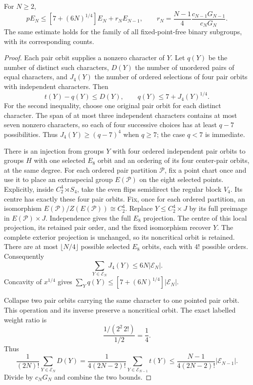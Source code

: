 \begin{proposition}\label{prop:binary-moment}
For $N\geq2$,
\begin{equation}\label{eq:binary-moment}
 pE_N\leq[7+(6N)^{1/4}]E_N+r_NE_{N-1},\qquad
 r_N=\frac{N-1}{4}\frac{c_{N-1}G_{N-1}}{c_NG_N}.
\end{equation}
The same estimate holds for the family of all fixed-point-free binary
subgroups, with its corresponding counts.
\end{proposition}
\begin{proof}
Each pair orbit supplies a nonzero character of $Y$. Let $q(Y)$ be
the number of distinct such characters, $D(Y)$ the number of unordered
pairs of equal characters, and $J_4(Y)$ the number of ordered selections
of four pair orbits with independent characters. Then
\[
 t(Y)-q(Y)\leq D(Y),\qquad
 q(Y)\leq7+J_4(Y)^{1/4}.
\]
For the second inequality, choose one original pair orbit for each
distinct character. The span of at most three independent characters
contains at most seven nonzero characters, so each of four successive
choices has at least $q-7$ possibilities. Thus
$J_4(Y)\geq(q-7)^4$ when $q\geq7$; the case $q<7$ is immediate.

There is an injection from groups $Y$ with four ordered independent
pair orbits to groups $H$ with one selected $E_8$ orbit and an ordering
of its four center-pair orbits, at the same degree. For each ordered
pair partition $\mathcal P$, fix a point chart once and use it to place
an extraspecial group $E(\mathcal P)$ on the eight selected points.
Explicitly, inside $C_2^4\rtimes S_4$, take the even flips semidirect
the regular block $V_4$. Its centre has exactly these four pair orbits.
Fix, once for each ordered partition,
an isomorphism $E(\mathcal P)/Z(E(\mathcal P))\cong C_2^4$.
Replace $Y\leq C_2^4\times J$ by its full preimage in
$E(\mathcal P)\times J$. Independence gives the full $E_8$ projection.
The centre of this local projection, its retained pair order, and the
fixed isomorphism recover $Y$.
The complete exterior projection is unchanged, so its noncritical
orbit is retained. There are at most $\lfloor N/4\rfloor$ possible
selected $E_8$ orbits, each with $4!$ possible orders. Consequently
\[
 \sum_{Y\in\mathcal E_N}J_4(Y)\leq 6N|\mathcal E_N|.
\]
Concavity of $x^{1/4}$ gives
$\sum_Yq(Y)\leq[7+(6N)^{1/4}]|\mathcal E_N|$.

Collapse two pair orbits carrying the same character to one pointed
pair orbit. This operation and its inverse preserve a noncritical
orbit. The exact labelled weight ratio is
\[
 \frac{1/(2^2\,2!)}{1/2}=\frac14.
\]
Thus
\[
 \frac1{(2N)!}\sum_{Y\in\mathcal E_N}D(Y)
 =\frac{1}{4(2N-2)!}\sum_{Y\in\mathcal E_{N-1}}t(Y)
 \leq\frac{N-1}{4(2N-2)!}|\mathcal E_{N-1}|.
\]
Divide by $c_NG_N$ and combine the two bounds.
\end{proof}

